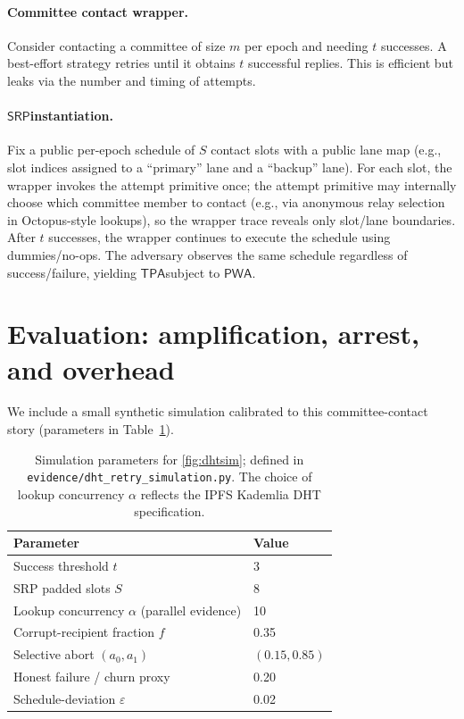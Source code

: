 \documentclass[11pt]{article}
\newcommand{\PWA}{\ensuremath{\mathsf{PWA}}}
\newcommand{\TPA}{\ensuremath{\mathsf{TPA}}}
\newcommand{\SRP}{\ensuremath{\mathsf{SRP}}}
\begin{document}
\paragraph{Committee contact wrapper.}
Consider contacting a committee of size $m$ per epoch and needing $t$ successes.
A best-effort strategy retries until it obtains $t$ successful replies.
This is efficient but leaks via the number and timing of attempts.

\paragraph{\SRP instantiation.}
Fix a public per-epoch schedule of $S$ contact slots with a public lane map (e.g., slot indices assigned to a ``primary'' lane and a ``backup'' lane).
For each slot, the wrapper invokes the attempt primitive once; the attempt primitive may internally choose which committee member to contact (e.g., via anonymous relay selection in Octopus-style lookups), so the wrapper trace reveals only slot/lane boundaries.
After $t$ successes, the wrapper continues to execute the schedule using dummies/no-ops.
The adversary observes the same schedule regardless of success/failure, yielding \TPA subject to \PWA.

\section{Evaluation: amplification, arrest, and overhead}
We include a small synthetic simulation calibrated to this committee-contact story (parameters in Table~\ref{tab:simparams}).

\begin{table}[t]
\centering
\begin{tabular}{@{}ll@{}}
\toprule
Parameter & Value \\
\midrule
Success threshold $t$ & 3 \\
SRP padded slots $S$ & 8 \\
Lookup concurrency $\alpha$ (parallel evidence) & 10 \\
Corrupt-recipient fraction $f$ & 0.35 \\
Selective abort $(a_0,a_1)$ & $(0.15, 0.85)$ \\
Honest failure / churn proxy & 0.20 \\
Schedule-deviation $\varepsilon$ & 0.02 \\
\bottomrule
\end{tabular}
\caption{Simulation parameters for \cref{fig:dhtsim}; defined in \texttt{evidence/dht\_retry\_simulation.py}. The choice of lookup concurrency $\alpha$ reflects the IPFS Kademlia DHT specification.\cite{ipfsKadDHTSpec2025}}
\label{tab:simparams}
\end{table}
\end{document}
